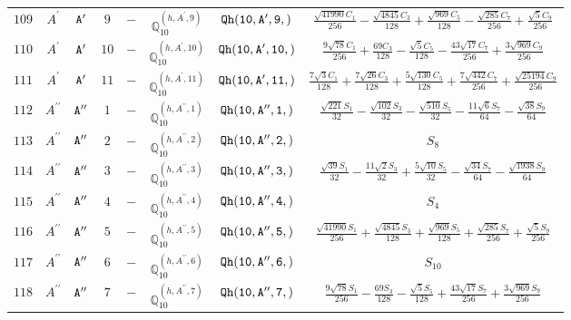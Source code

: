 \documentclass[fleqn,8pt]{jsarticle}
\begin{document}
\begin{table}[ht!]
\begin{center}
\begin{tabular}{cccccccc}
$ 109 $ & $ A^{\prime} $ & $ {\tt A'} $ & $ 9 $ & $ - $ & $ \mathbb{Q}_{10}^{(h,A^{\prime},9)} $ & $ {\tt Qh(10,A',9,)} $ & $ \frac{\sqrt{41990} C_{1}}{256} - \frac{\sqrt{4845} C_{3}}{128} + \frac{\sqrt{969} C_{5}}{128} - \frac{\sqrt{285} C_{7}}{256} + \frac{\sqrt{5} C_{9}}{256} $ \\
$ 110 $ & $ A^{\prime} $ & $ {\tt A'} $ & $ 10 $ & $ - $ & $ \mathbb{Q}_{10}^{(h,A^{\prime},10)} $ & $ {\tt Qh(10,A',10,)} $ & $ \frac{9 \sqrt{78} C_{1}}{256} + \frac{69 C_{3}}{128} - \frac{\sqrt{5} C_{5}}{128} - \frac{43 \sqrt{17} C_{7}}{256} + \frac{3 \sqrt{969} C_{9}}{256} $ \\
$ 111 $ & $ A^{\prime} $ & $ {\tt A'} $ & $ 11 $ & $ - $ & $ \mathbb{Q}_{10}^{(h,A^{\prime},11)} $ & $ {\tt Qh(10,A',11,)} $ & $ \frac{7 \sqrt{3} C_{1}}{128} + \frac{7 \sqrt{26} C_{3}}{128} + \frac{5 \sqrt{130} C_{5}}{128} + \frac{7 \sqrt{442} C_{7}}{256} + \frac{\sqrt{25194} C_{9}}{256} $ \\
$ 112 $ & $ A^{\prime\prime} $ & $ {\tt A''} $ & $ 1 $ & $ - $ & $ \mathbb{Q}_{10}^{(h,A^{\prime\prime},1)} $ & $ {\tt Qh(10,A'',1,)} $ & $ \frac{\sqrt{221} S_{1}}{32} - \frac{\sqrt{102} S_{3}}{32} - \frac{\sqrt{510} S_{5}}{32} - \frac{11 \sqrt{6} S_{7}}{64} - \frac{\sqrt{38} S_{9}}{64} $ \\
$ 113 $ & $ A^{\prime\prime} $ & $ {\tt A''} $ & $ 2 $ & $ - $ & $ \mathbb{Q}_{10}^{(h,A^{\prime\prime},2)} $ & $ {\tt Qh(10,A'',2,)} $ & $ S_{8} $ \\
$ 114 $ & $ A^{\prime\prime} $ & $ {\tt A''} $ & $ 3 $ & $ - $ & $ \mathbb{Q}_{10}^{(h,A^{\prime\prime},3)} $ & $ {\tt Qh(10,A'',3,)} $ & $ \frac{\sqrt{39} S_{1}}{32} - \frac{11 \sqrt{2} S_{3}}{32} + \frac{5 \sqrt{10} S_{5}}{32} - \frac{\sqrt{34} S_{7}}{64} - \frac{\sqrt{1938} S_{9}}{64} $ \\
$ 115 $ & $ A^{\prime\prime} $ & $ {\tt A''} $ & $ 4 $ & $ - $ & $ \mathbb{Q}_{10}^{(h,A^{\prime\prime},4)} $ & $ {\tt Qh(10,A'',4,)} $ & $ S_{4} $ \\
$ 116 $ & $ A^{\prime\prime} $ & $ {\tt A''} $ & $ 5 $ & $ - $ & $ \mathbb{Q}_{10}^{(h,A^{\prime\prime},5)} $ & $ {\tt Qh(10,A'',5,)} $ & $ \frac{\sqrt{41990} S_{1}}{256} + \frac{\sqrt{4845} S_{3}}{128} + \frac{\sqrt{969} S_{5}}{128} + \frac{\sqrt{285} S_{7}}{256} + \frac{\sqrt{5} S_{9}}{256} $ \\
$ 117 $ & $ A^{\prime\prime} $ & $ {\tt A''} $ & $ 6 $ & $ - $ & $ \mathbb{Q}_{10}^{(h,A^{\prime\prime},6)} $ & $ {\tt Qh(10,A'',6,)} $ & $ S_{10} $ \\
$ 118 $ & $ A^{\prime\prime} $ & $ {\tt A''} $ & $ 7 $ & $ - $ & $ \mathbb{Q}_{10}^{(h,A^{\prime\prime},7)} $ & $ {\tt Qh(10,A'',7,)} $ & $ \frac{9 \sqrt{78} S_{1}}{256} - \frac{69 S_{3}}{128} - \frac{\sqrt{5} S_{5}}{128} + \frac{43 \sqrt{17} S_{7}}{256} + \frac{3 \sqrt{969} S_{9}}{256} $ \\

\end{tabular}
\end{center}
\end{table}
\end{document}
